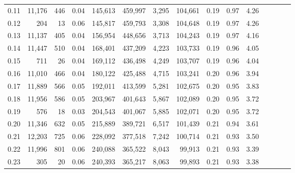 \begin{tabular}{rrrcrrrrrrrrrrr}
0.11 &  11,176 &     446 &                                       0.04 &  145,613 &  459,997 &    3,295 &  104,661 &  0.19 &  0.97 &                         4.26 \\
0.12 &     204 &      13 &                                       0.06 &  145,817 &  459,793 &    3,308 &  104,648 &  0.19 &  0.97 &                         4.26 \\
0.13 &  11,137 &     405 &                                       0.04 &  156,954 &  448,656 &    3,713 &  104,243 &  0.19 &  0.97 &                         4.16 \\
0.14 &  11,447 &     510 &                                       0.04 &  168,401 &  437,209 &    4,223 &  103,733 &  0.19 &  0.96 &                         4.05 \\
0.15 &     711 &      26 &                                       0.04 &  169,112 &  436,498 &    4,249 &  103,707 &  0.19 &  0.96 &                         4.04 \\
0.16 &  11,010 &     466 &                                       0.04 &  180,122 &  425,488 &    4,715 &  103,241 &  0.20 &  0.96 &                         3.94 \\
0.17 &  11,889 &     566 &                                       0.05 &  192,011 &  413,599 &    5,281 &  102,675 &  0.20 &  0.95 &                         3.83 \\
0.18 &  11,956 &     586 &                                       0.05 &  203,967 &  401,643 &    5,867 &  102,089 &  0.20 &  0.95 &                         3.72 \\
0.19 &     576 &      18 &                                       0.03 &  204,543 &  401,067 &    5,885 &  102,071 &  0.20 &  0.95 &                         3.72 \\
0.20 &  11,346 &     632 &                                       0.05 &  215,889 &  389,721 &    6,517 &  101,439 &  0.21 &  0.94 &                         3.61 \\
0.21 &  12,203 &     725 &                                       0.06 &  228,092 &  377,518 &    7,242 &  100,714 &  0.21 &  0.93 &                         3.50 \\
0.22 &  11,996 &     801 &                                       0.06 &  240,088 &  365,522 &    8,043 &   99,913 &  0.21 &  0.93 &                         3.39 \\
0.23 &     305 &      20 &                                       0.06 &  240,393 &  365,217 &    8,063 &   99,893 &  0.21 &  0.93 &                         3.38 \\

\end{tabular}
